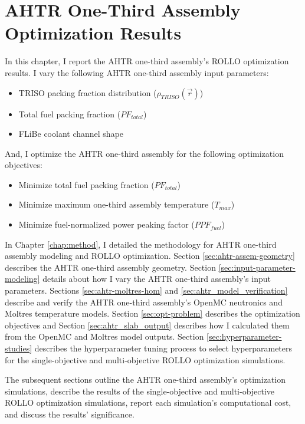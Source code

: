 \chapter{AHTR One-Third Assembly Optimization Results}
\glsresetall
\label{chap:ahtr-assem-opt-results}
In this chapter, I report the \gls{AHTR} one-third assembly's \gls{ROLLO} optimization 
results. 
I vary the following \gls{AHTR} one-third assembly input parameters:
\begin{itemize}
    \item \gls{TRISO} packing fraction distribution ($\rho_{TRISO}(\vec{r})$)
    \item Total fuel packing fraction ($PF_{total}$)
    \item \gls{FLiBe} coolant channel shape
\end{itemize} 
And, I optimize the \gls{AHTR} one-third assembly for the following optimization 
objectives:
\begin{itemize}
    \item Minimize total fuel packing fraction ($PF_{total}$)
    \item Minimize maximum one-third assembly temperature ($T_{max}$)
    \item Minimize fuel-normalized power peaking factor ($PPF_{fuel}$)
\end{itemize} 
 
In Chapter \ref{chap:method}, I detailed the methodology for \gls{AHTR} one-third 
assembly modeling and \gls{ROLLO} optimization. 
Section \ref{sec:ahtr-assem-geometry} describes the \gls{AHTR} one-third assembly 
geometry.
Section \ref{sec:input-parameter-modeling} details about how I vary the 
\gls{AHTR} one-third assembly's input parameters. 
Sections \ref{sec:ahtr-moltres-hom} and \ref{sec:ahtr_model_verification}
describe and verify the \gls{AHTR} one-third assembly's OpenMC neutronics and Moltres 
temperature models. 
Section \ref{sec:opt-problem} describes the optimization objectives and Section 
\ref{sec:ahtr_slab_output} describes how I calculated them from the OpenMC and Moltres 
model outputs. 
Section \ref{sec:hyperparameter-studies} describes the hyperparameter tuning process 
to select hyperparameters for the single-objective and multi-objective \gls{ROLLO} 
optimization simulations.

The subsequent sections outline the \gls{AHTR} one-third assembly's optimization 
simulations, describe the results of the single-objective and multi-objective 
\gls{ROLLO} optimization simulations, report each simulation's computational cost, 
and discuss the results' significance.

